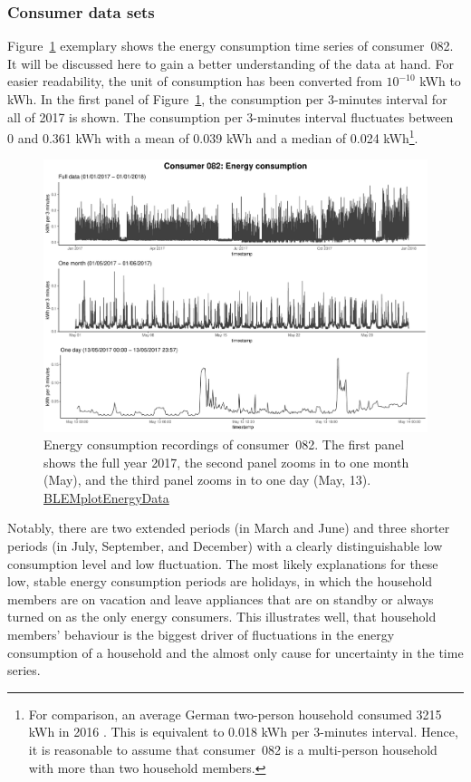 \subsubsection{Consumer data sets}

Figure~\ref{Fig:energycons_c082} exemplary shows the energy consumption time series of consumer~082. It will be discussed here to gain a better understanding of the data at hand. For easier readability, the unit of consumption has been converted from $10^{-10}$ kWh to kWh. In the first panel of Figure~\ref{Fig:energycons_c082}, the consumption per 3-minutes interval for all of 2017 is shown. The consumption per 3-minutes interval fluctuates between 0 and 0.361 kWh with a mean of 0.039 kWh and a median of 0.024 kWh\footnote{For comparison, an average German two-person household consumed 3215 kWh in 2016 \citep{Destatis:2018}. This is equivalent to 0.018 kWh per 3-minutes interval. Hence, it is reasonable to assume that consumer~082 is a multi-person household with more than two household members.}.

\begin{figure}[ht]
 \centering
\includegraphics[width=\textwidth]{thesis/graphs/timeseries/c082_cons.pdf}
\caption[Energy consumption recordings of consumer~082]{Energy consumption recordings of consumer~082. The first panel shows the full year 2017, the second panel zooms in to one month (May), and the third panel zooms in to one day (May, 13). \quantnet\href{https://github.com/QuantLet/BLEM/tree/master/BLEMplotEnergyData}{BLEMplotEnergyData}}
\label{Fig:energycons_c082}
\end{figure}

Notably, there are two extended periods (in March and June) and three shorter periods (in July, September, and December) with a clearly distinguishable low consumption level and low fluctuation. The most likely explanations for these low, stable energy consumption periods are holidays, in which the household members are on vacation and leave appliances that are on standby or always turned on as the only energy consumers. This illustrates well, that household members' behaviour is the biggest driver of fluctuations in the energy consumption of a household and the almost only cause for uncertainty in the time series.

